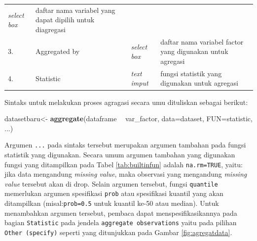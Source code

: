 \documentclass[12pt,]{krantz}
\newenvironment{Shaded}{\begin{snugshade}}{\end{snugshade}}
\newcommand{\DataTypeTok}[1]{\textcolor[rgb]{0.13,0.29,0.53}{#1}}
\newcommand{\KeywordTok}[1]{\textcolor[rgb]{0.13,0.29,0.53}{\textbf{#1}}}
\newcommand{\NormalTok}[1]{#1}
\newcommand{\OperatorTok}[1]{\textcolor[rgb]{0.81,0.36,0.00}{\textbf{#1}}}
\newcommand{\StringTok}[1]{\textcolor[rgb]{0.31,0.60,0.02}{#1}}
\begin{document}
\begin{longtable}[]{@{}llll@{}}
\begin{minipage}[t]{0.09\columnwidth}
\emph{select box}\strut
\end{minipage} & \begin{minipage}[t]{0.61\columnwidth}\raggedright
daftar nama variabel yang dapat dipilih untuk diagregasi\strut
\end{minipage}\tabularnewline
\begin{minipage}[t]{0.04\columnwidth}\raggedright
3.\strut
\end{minipage} & \begin{minipage}[t]{0.14\columnwidth}\raggedright
Aggregated by\strut
\end{minipage} & \begin{minipage}[t]{0.09\columnwidth}\raggedright
\emph{select box}\strut
\end{minipage} & \begin{minipage}[t]{0.61\columnwidth}\raggedright
daftar nama variabel factor yang digunakan untuk agregasi\strut
\end{minipage}\tabularnewline
\begin{minipage}[t]{0.04\columnwidth}\raggedright
4.\strut
\end{minipage} & \begin{minipage}[t]{0.14\columnwidth}\raggedright
Statistic\strut
\end{minipage} & \begin{minipage}[t]{0.09\columnwidth}\raggedright
\emph{text imput}\strut
\end{minipage} & \begin{minipage}[t]{0.61\columnwidth}\raggedright
fungsi statistik yang digunakan untuk agregasi\strut
\end{minipage}\tabularnewline
\bottomrule
\end{longtable}

Sintaks untuk melakukan proses agragasi secara umu dituliskan sebagai berikut:

\begin{Shaded}
\begin{Highlighting}[]
\NormalTok{datasetbaru<-}\StringTok{ }\KeywordTok{aggregate}\NormalTok{(dataframe }\OperatorTok{~}\StringTok{ }\NormalTok{var_factor, }
                        \DataTypeTok{data=}\NormalTok{dataset, }\DataTypeTok{FUN=}\NormalTok{statistic, ...)}
\end{Highlighting}
\end{Shaded}

Argumen \texttt{...} pada sintaks tersebut merupakan argumen tambahan pada fungsi statistik yang digunakan. Secara umum argumen tambahan yang digunakan fungsi yang ditampilkan pada Tabel \ref{tab:builtinfun} adalah \texttt{na.rm=TRUE}, yaitu: jika data mengandung \emph{missing value}, maka observasi yang mengandung \emph{missing value} tersebut akan di drop. Selain argumen tersebut, fungsi \texttt{quantile} memerlukan argumen spesifikasi \texttt{prob} atau spesifikasi kuantil yang akan ditampilkan (misal:\texttt{prob=0.5} untuk kuantil ke-50 atau median). Untuk menambahkan argumen tersebut, pembaca dapat menspesifikasikannya pada bagian \texttt{Statistic} pada jendela \texttt{aggregate\ observations} yaitu pada pilihan \texttt{Other\ (specify)} seperti yang ditunjukkan pada Gambar \ref{fig:agregatdata}.
\end{document}
